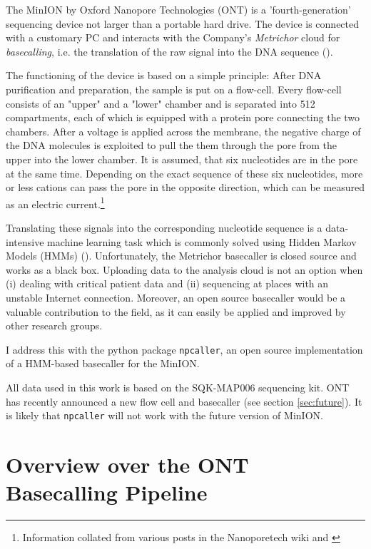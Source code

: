 \documentclass[]{scrartcl}
\begin{document}
The MinION by Oxford Nanopore Technologies (ONT) is a 'fourth-generation' sequencing device not larger than a portable hard drive. The device is connected with a customary PC and interacts with the Company's \textit{Metrichor} cloud for \textit{basecalling}, i.e. the translation of the raw signal into the DNA sequence (\cite{Feng2015}). 

The functioning of the device is based on a simple principle: After DNA purification and preparation, the sample is put on a flow-cell. Every flow-cell consists of an "upper" and a "lower" chamber and is separated into 512 compartments, each of which is equipped with a protein pore connecting the two chambers. After a voltage is applied across the membrane, the negative charge of the DNA molecules is exploited to pull the them through the pore from the upper into the lower chamber. It is assumed, that six nucleotides are in the pore at the same time. Depending on the exact sequence of these six nucleotides, more or less cations can pass the pore in the opposite direction, which can be measured as an electric current.\footnote{Information collated from various posts in the Nanoporetech wiki and \cite{Feng2015}} 

Translating these signals into the corresponding nucleotide sequence is a data-intensive machine learning task which is commonly solved using Hidden Markov Models (HMMs) (\cite{Timp2012a}). Unfortunately, the Metrichor basecaller is closed source and works as a black box. Uploading data to the analysis cloud is not an option when (i) dealing with critical patient data and (ii) sequencing at places with an unstable Internet connection. Moreover, an open source basecaller would be a valuable contribution to the field, as it can easily be applied and improved by other research groups.

I address this with the python package \texttt{npcaller}, an open source implementation of a HMM-based basecaller for the MinION. 

All data used in this work is based on the SQK-MAP006 sequencing kit. ONT has recently announced a new flow cell and basecaller (see section \ref{sec:future}). It is likely that \texttt{npcaller} will not work with the future version of MinION. 

\section{Overview over the ONT Basecalling Pipeline}
\end{document}
